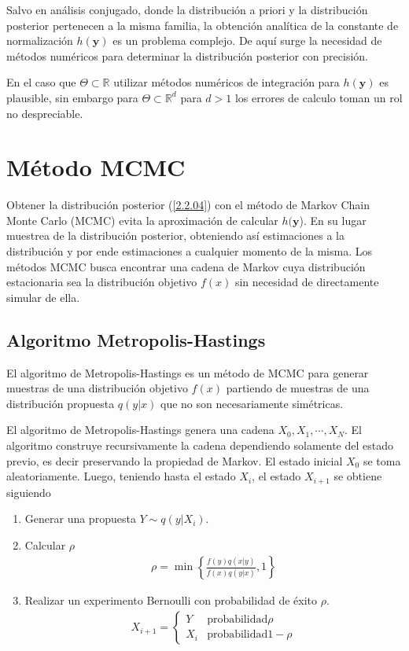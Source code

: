 Salvo en análisis conjugado, donde la distribución a priori y la distribución posterior pertenecen a la misma familia, la obtención analítica de la constante de normalización $h(\mathbf{y})$ es un problema complejo. De aquí surge la necesidad de métodos numéricos para determinar la distribución posterior con precisión. 

En el caso que $\Theta \subset \mathbb{R}$ utilizar métodos numéricos de integración para $h(\mathbf{y})$ es plausible, sin embargo para $\Theta \subset \mathbb{R}^d$ para $d>1$ los errores de calculo toman un rol no despreciable.

\section{Método MCMC}

Obtener la distribución posterior (\ref{2.2.04}) con el método de Markov Chain Monte Carlo (MCMC) evita la aproximación de calcular $h(\mathbf{y}$). En su lugar muestrea de la distribución posterior, obteniendo así estimaciones a la distribución y por ende estimaciones a cualquier momento de la misma. Los métodos MCMC busca encontrar una cadena de Markov cuya distribución estacionaria sea la distribución objetivo $f(x)$ sin necesidad de directamente simular de ella. 


\subsection{Algoritmo Metropolis-Hastings}

El algoritmo de Metropolis-Hastings es un método de MCMC para generar muestras de una distribución objetivo $f(x)$ partiendo de muestras de una distribución propuesta $q(y|x)$ que no son necesariamente simétricas. 

El algoritmo de Metropolis-Hastings genera una cadena $X_0, X_1, \cdots, X_N$. El algoritmo construye recursivamente la cadena dependiendo solamente del estado previo, es decir preservando la propiedad de Markov. El estado inicial $X_0$ se toma aleatoriamente. Luego, teniendo hasta el estado $X_i$, el estado $X_{i+1}$ se obtiene siguiendo 
\begin{enumerate}
    \item Generar una propuesta $Y \sim q(y|X_i)$.
    \item Calcular $\rho$ 
    \begin{align*}
        \rho = \min \left \{ \frac{f(y)q(x|y)}{f(x)q(y|x)}, 1  \right \} 
    \end{align*}
    \item Realizar un experimento Bernoulli con probabilidad de éxito $\rho$.
    \begin{align*}
        X_{i+1} = \left\{\begin{matrix}
            Y & \text{probabilidad} \rho  \\ 
            X_{i}& \text{probabilidad} 1- \rho  
           \end{matrix}\right.
    \end{align*}
\end{enumerate}

